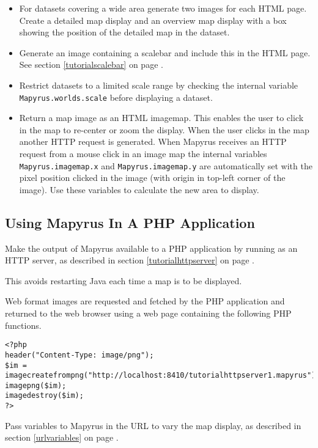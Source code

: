 \begin{itemize}
\item
For datasets covering a wide area generate two images for
each HTML page.  Create a detailed map display and an overview map display
with a box showing the position of the detailed map in the dataset.

\item
Generate an image containing a scalebar
and include this in the HTML page.  See section \ref{tutorialscalebar}
on page \pageref{tutorialscalebar}.

\item
Restrict datasets to a limited scale range by checking the
internal variable
\texttt{Mapyrus.worlds.scale} before displaying a dataset.

\item
Return a map image as an HTML imagemap.  This enables the user to click
in the map to re-center or zoom the display.  When the user clicks
in the map another HTTP request is generated.  When Mapyrus receives
an HTTP request from a mouse click in an image map the internal variables
\texttt{Mapyrus.imagemap.x} and
\texttt{Mapyrus.imagemap.y} are automatically set with the pixel position
clicked in the image (with origin in top-left corner of the image).
Use these variables to calculate the new area to display.
\end{itemize}

\subsection{Using Mapyrus In A PHP Application}

Make the output of Mapyrus available to a PHP application by running as an
HTTP server, as described in section \ref{tutorialhttpserver}
on page \pageref{tutorialhttpserver}.

This avoids restarting Java each time a map is to be displayed.

Web format images are requested and fetched by the PHP
application and returned to the web browser using a
web page containing the following PHP functions.

\begin{verbatim}
<?php
header("Content-Type: image/png");
$im = imagecreatefrompng("http://localhost:8410/tutorialhttpserver1.mapyrus");
imagepng($im);
imagedestroy($im);
?>
\end{verbatim}

Pass variables to Mapyrus in the URL to vary the map display,
as described in section \ref{urlvariables}
on page \pageref{urlvariables}.

